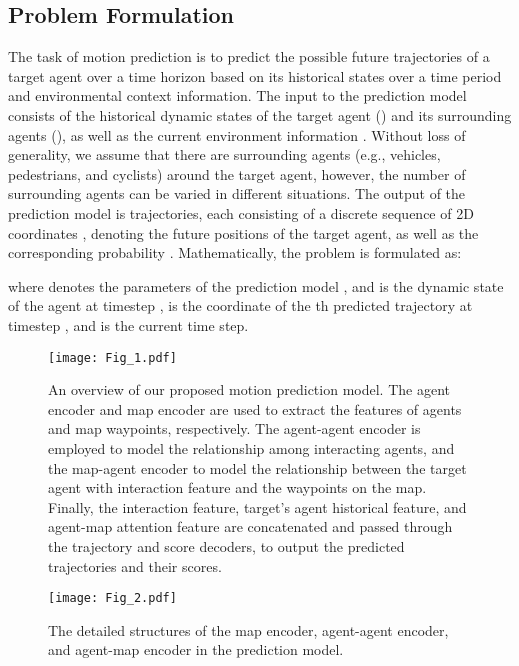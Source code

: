 \documentclass[letterpaper, 10 pt, conference]{ieeeconf}
\begin{document}
\subsection{Problem Formulation} 
The task of motion prediction is to predict the possible future trajectories of a target agent over a time horizon  based on its historical states over a time period  and environmental context information. The input  to the prediction model consists of the historical dynamic states of the target agent () and its surrounding agents (), as well as the current environment information . Without loss of generality, we assume that there are  surrounding agents (e.g., vehicles, pedestrians, and cyclists) around the target agent, however, the number of surrounding agents can be varied in different situations. The output of the prediction model  is  trajectories, each consisting of a discrete sequence of 2D coordinates , denoting the future positions of the target agent, as well as the corresponding probability . Mathematically, the problem is formulated as:

where  denotes the parameters of the prediction model ,  and  is the dynamic state of the agent  at timestep ,  is the coordinate of the th predicted trajectory at timestep , and  is the current time step.

\begin{figure*}[htp]
    \centering
    \texttt{[image: Fig\_1.pdf]}
    \caption{An overview of our proposed motion prediction model. The agent encoder and map encoder are used to extract the features of agents and map waypoints, respectively. The agent-agent encoder is employed to model the relationship among interacting agents, and the map-agent encoder to model the relationship between the target agent with interaction feature and the waypoints on the map. Finally, the interaction feature, target's agent historical feature, and agent-map attention feature are concatenated and passed through the trajectory and score decoders, to output the predicted trajectories and their scores.}
    \label{fig:fig.1}
\end{figure*}


\begin{figure}[htp]
    \centering
    \texttt{[image: Fig\_2.pdf]}
    \caption{The detailed structures of the map encoder, agent-agent encoder, and agent-map encoder in the prediction model.}
    \label{fig:fig.2}
\end{figure}
\end{document}

